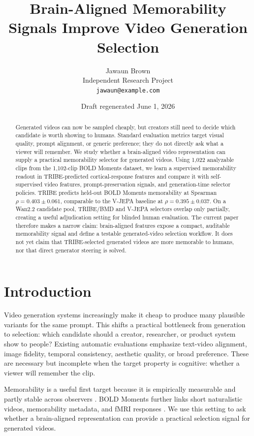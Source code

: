 \documentclass[11pt]{article}
\title{Brain-Aligned Memorability Signals Improve Video Generation Selection}
\author{
  Jawaun Brown\\
  Independent Research Project\\
  \texttt{jawaun@example.com}
}
\date{Draft regenerated June 1, 2026}
\begin{document}
\maketitle

\begin{abstract}
Generated videos can now be sampled cheaply, but creators still need to decide
which candidate is worth showing to humans. Standard evaluation metrics target
visual quality, prompt alignment, or generic preference; they do not directly ask
what a viewer will remember. We study whether a brain-aligned video
representation can supply a practical memorability selector for generated
videos. Using 1,022 analyzable clips from the 1,102-clip BOLD Moments dataset,
we learn a supervised memorability readout in TRIBE-predicted cortical-response
features and compare it with self-supervised video features, prompt-preservation
signals, and generation-time selector policies. TRIBE predicts held-out BOLD
Moments memorability at Spearman $\rho=0.403\pm0.061$, comparable to the V-JEPA
baseline at $\rho=0.395\pm0.037$. On a Wan2.2 candidate pool, TRIBE/BMD and
V-JEPA selectors overlap only partially, creating a useful adjudication setting
for blinded human evaluation. The current paper therefore makes a narrow claim:
brain-aligned features expose a compact, auditable memorability signal and define
a testable generated-video selection workflow. It does not yet claim that
TRIBE-selected generated videos are more memorable to humans, nor that direct
generator steering is solved.
\end{abstract}

\section{Introduction}

Video generation systems increasingly make it cheap to produce many plausible
variants for the same prompt. This shifts a practical bottleneck from generation
to selection: which candidate should a creator, researcher, or product system
show to people? Existing automatic evaluations emphasize text-video alignment,
image fidelity, temporal consistency, aesthetic quality, or broad preference.
These are necessary but incomplete when the target property is cognitive:
whether a viewer will remember the clip.

Memorability is a useful first target because it is empirically measurable and
partly stable across observers \citep{isola2011memorability,newman2020memento}.
BOLD Moments further links short naturalistic videos, memorability metadata, and
fMRI responses \citep{lahner2024boldmoments}. We use this setting to ask whether
a brain-aligned representation can provide a practical selection signal for
generated videos.
\end{document}
